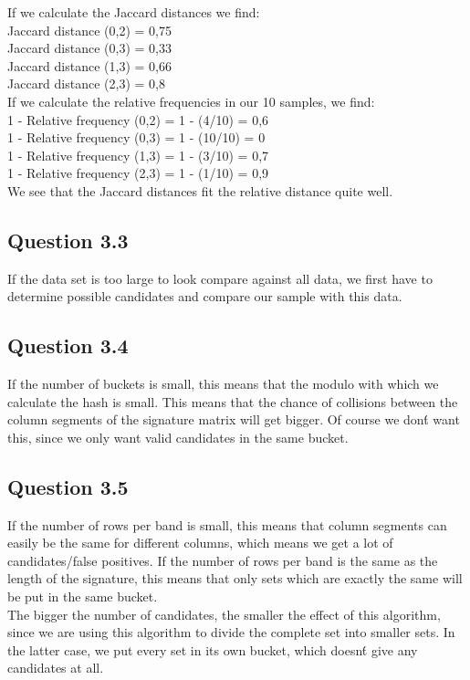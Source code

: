 \documentclass[11pt,twoside,a4paper]{article}
\begin{document}
 	If we calculate the Jaccard distances we find: \\
 	Jaccard distance (0,2) = 0,75 \\
 	Jaccard distance (0,3) = 0,33 \\
 	Jaccard distance (1,3) = 0,66 \\
 	Jaccard distance (2,3) = 0,8 \\
 	
 	If we calculate the relative frequencies in our 10 samples, we find: \\
 	1 - Relative frequency (0,2) = 1 - (4/10) = 0,6 \\
 	1 - Relative frequency (0,3) = 1 - (10/10) = 0 \\
 	1 - Relative frequency (1,3) = 1 - (3/10) = 0,7 \\
 	1 - Relative frequency (2,3) = 1 - (1/10) = 0,9 \\
 	
 	We see that the Jaccard distances fit the relative distance quite well. 
 	
 	\subsection{Question 3.3}
 	If the data set is too large to look compare against all data, we first have to determine possible candidates and compare our sample with this data. 
 	
 	\subsection{Question 3.4}
 	If the number of buckets is small, this means that the modulo with which we calculate the hash is small. This means that the chance of collisions between the column segments of the signature matrix will get bigger. Of course we don\'t want this, since we only want valid candidates in the same bucket.
 	 	
 	\subsection{Question 3.5}
 	If the number of rows per band is small, this means that column segments can easily be the same for different columns, which means we get a lot of candidates/false positives. If the number of rows per band is the same as the length of the signature, this means that only sets which are exactly the same will be put in the same bucket. \\
 	The bigger the number of candidates, the smaller the effect of this algorithm, since we are using this algorithm to divide the complete set into smaller sets. In the latter case, we put every set in its own bucket, which doesn\'t give any candidates at all. 

		
	
\begin{thebibliography}{9}
\end{thebibliography}
\end{document}
